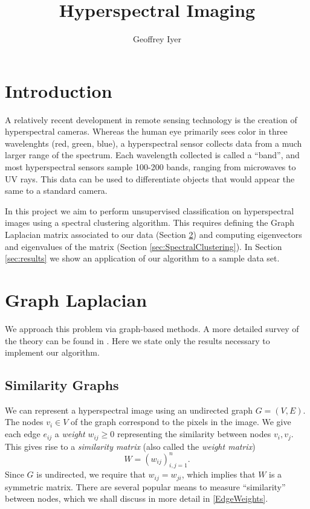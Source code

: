\documentclass[12pt]{article}
\begin{document}
 

\title{Hyperspectral Imaging}
\author{Geoffrey Iyer}
\maketitle
\tableofcontents

\section{Introduction}

A relatively recent development in remote sensing technology is the creation of hyperspectral cameras. Whereas the human eye primarily sees color in three wavelenghts (red, green, blue), a hyperspectral sensor collects data from a much larger range of the spectrum. Each wavelength collected is called a ``band'', and most hyperspectral sensors sample 100-200 bands, ranging from microwaves to UV rays. This data can be used to differentiate objects that would appear the same to a standard camera.

In this project we aim to perform unsupervised classification on hyperspectral images using a spectral clustering algorithm. This requires defining the Graph Laplacian matrix associated to our data (Section \ref{sec:GraphLaplacian}) and computing eigenvectors and eigenvalues of the matrix (Section \ref{sec:SpectralClustering}). In Section \ref{sec:results} we show an application of our algorithm to a sample data set.

\section{Graph Laplacian} \label{sec:GraphLaplacian}
We approach this problem via graph-based methods. A more detailed survey of the theory can be found in \cite{ref:SpectralClustering2}. Here we state only the results necessary to implement our algorithm.

\subsection{Similarity Graphs}
We can represent a hyperspectral image using an undirected graph $G = (V,E)$. The nodes $v_i\in V$ of the graph correspond to the pixels in the image. We give each edge $e_{ij}$ a \emph{weight} $w_{ij}\geq 0$ representing the similarity between nodes $v_i, v_j$. This gives rise to a \emph{similarity matrix} (also called the \emph{weight matrix}) \[W = \left(w_{ij}\right)_{i,j=1}^n.\] Since $G$ is undirected, we require that $w_{ij} = w_{ji}$, which implies that $W$ is a symmetric matrix. There are several popular means to measure ``similarity'' between nodes, which we shall discuss in more detail in \ref{EdgeWeights}.
\end{document}
